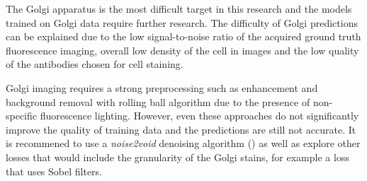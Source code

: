 The Golgi apparatus is the most difficult target in this research and the models trained on Golgi data require further research. The difficulty of Golgi predictions can be explained due to the low signal-to-noise ratio of the acquired ground truth fluorescence imaging, overall low density of the cell in images and the low quality of the antibodies chosen for cell staining. 

Golgi imaging requires a strong preprocessing such as enhancement and background removal with rolling ball algorithm due to the presence of non-specific fluorescence lighting. However, even these approaches do not significantly improve the quality of training data and the predictions are still not accurate. It is recommened to use a \textit{noise2void} denoising algorithm (\cite{noise2void}) as well as explore other losses that would include the granularity of the Golgi stains, for example a loss that uses Sobel filters.